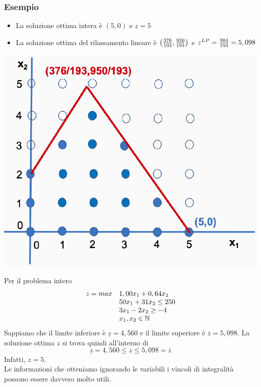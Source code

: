 \documentclass[12pt,a4paper]{article}
\begin{document}
\subsubsection{Esempio}
\begin{Parallel}{0.45 \textwidth}{0.45 \textwidth}
\end{Parallel}
\begin{itemize}
\item La soluzione ottima intera è $(5,0)$ e $z=5$
\item La soluzione ottima del rilassamento lineare è $\left({376 \over 193}, {950\over 193}\right)$ e $z^{LP} = {984 \over 193} = 5,098$
\end{itemize}
\begin{center}
\includegraphics[width=0.4\columnwidth]{img/ip1.png}
\end{center}
Per il problema intero
$$\begin{array}{rl}
  z = max & 1,00 x_1 + 0,64 x_2\\
  & 50 x_1 + 31 x_2 \leq 250\\
  & 3 x_1 - 2x_2 \geq -4\\
  & x_1,x_2  \in \mathbb{N}
  \end{array}$$
Sappiamo che il limite inferiore è $\underline{z}=4,560$ e il limite superiore è $\overline{z}=5,098$. La soluzione ottima $z$ si trova quindi all'interno di $$\underline{z}=4,560 \leq z \leq 5,098 = \overline{z}$$
Infatti, $z=5$.\\
Le informazioni che otteniamo ignorando le variabili i vincoli di integralità possono essere davvero molto utili.
 
\end{document}
